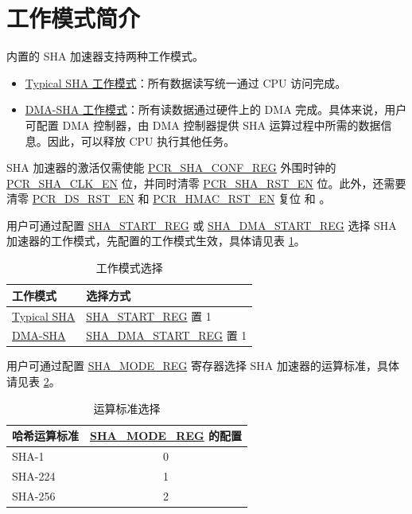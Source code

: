 \documentclass[main\_\_CN.tex]{subfiles}
\begin{document}
\section{工作模式简介}
\chipname{} 内置的 SHA 加速器支持两种工作模式。

\begin{itemize}
    \item \hyperref[sec:sha-typical-sha]{Typical SHA 工作模式}：所有数据读写统一通过 CPU 访问完成。
    \item \hyperref[sec:sha-dma-sha]{DMA-SHA 工作模式}：所有读数据通过硬件上的 DMA 完成。具体来说，用户可配置 DMA 控制器，由 DMA 控制器提供 SHA 运算过程中所需的数据信息。因此，可以释放 CPU 执行其他任务。
\end{itemize}    

SHA 加速器的激活仅需使能 \hyperref[regdesc:PCRSHACONFREG]{PCR\_SHA\_CONF\_REG} 外围时钟的 \hyperref[fielddesc:PCRRSACLKEN]{PCR\_SHA\_CLK\_EN} 位，并同时清零 \hyperref[fielddesc:PCRRSARSTEN]{PCR\_SHA\_RST\_EN} 位。此外，还需要清零 \hyperref[fielddesc:PCRDSRSTEN]{PCR\_DS\_RST\_EN} 和 \hyperref[fielddesc:PCRHMACRSTEN]{PCR\_HMAC\_RST\_EN} 复位  和 。

用户可通过配置 \hyperref[regdesc:SHASTARTREG]{SHA\_START\_REG} 或 \hyperref[regdesc:SHADMASTARTREG]{SHA\_DMA\_START\_REG} 选择 SHA 加速器的工作模式，先配置的工作模式生效，具体请见表 \ref{tab:sha-hash-algo-select}。

\begin{longtable}[c]{ |l|l| }
\caption{工作模式选择}
\label{tab:sha-hash-algo-select}
\\\hline 
\rowcolor{lightgray}
\textbf{工作模式}      & \textbf{选择方式}\\
    \hline
    \hyperref[sec:sha-typical-sha]{Typical SHA}      &  \hyperref[regdesc:SHASTARTREG]{SHA\_START\_REG} 置 1   \\
    \hline
    \hyperref[sec:sha-dma-sha]{DMA-SHA}           &  \hyperref[regdesc:SHADMASTARTREG]{SHA\_DMA\_START\_REG} 置 1   \\
    \hline
\end{longtable}

\clearpage
用户可通过配置 \hyperref[regdesc:SHAMODEREG]{SHA\_MODE\_REG} 寄存器选择 SHA 加速器的运算标准，具体请见表 \ref{tab:sha-mode-summary}。

\begin{longtable}[c]{|l|c|}
\caption{运算标准选择}
\label{tab:sha-mode-summary}
\\\hline
\rowcolor{lightgray}
\textbf{哈希运算标准} & \textbf{\hyperref[regdesc:SHAMODEREG]{SHA\_MODE\_REG} 的配置}\\
    \hline
    SHA-1 & 0\\
    \hline
    SHA-224 & 1\\
    \hline
    SHA-256 & 2\\
    \hline
\end{longtable}
\end{document}
